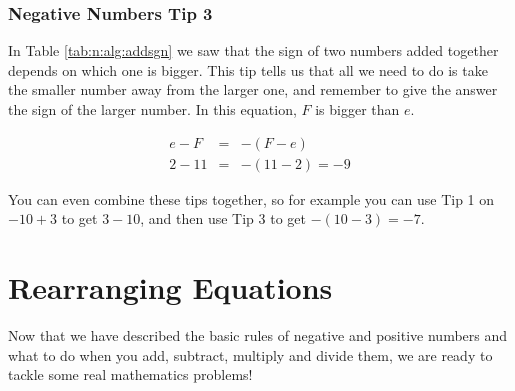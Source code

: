 \documentclass[10pt,a4paper,titlepage,twoside,openright]{report}
\begin{document}
\subsubsection{Negative Numbers Tip 3}
In Table \ref{tab:n:alg:addsgn} we saw that the sign of two numbers added
together depends on which one is bigger. This tip tells us that all we need to
do is take the smaller number away from the larger one, and remember to give 
the answer the sign of the larger number. In this equation, $F$ is bigger than $e$.

\begin{eqnarray}
  \label{eq:mfoundation:alg:rule3}
  e-F &=& -(F-e)\\ \nonumber
  2 - 11 &=& -(11-2) = -9
\end{eqnarray}

You can even combine these tips together, so for example you can use Tip 1 on
$-10+3$ to get $3-10$, and then use Tip 3 to get $-(10-3)=-7$.




\section{Rearranging Equations}
\label{mfoundation:alg:r}
Now that we have described the basic rules of negative and positive numbers and
what to do when you add, subtract, multiply and divide them, we are ready to
tackle some real mathematics problems!
\end{document}
